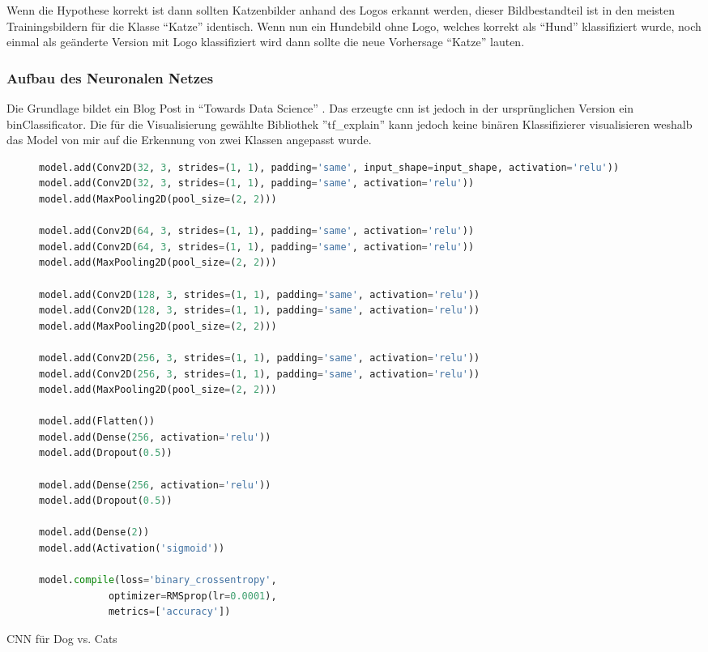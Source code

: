 \documentclass[
  12pt, %
  a4paper, %
  oneside, %
  openany, 
  numbers=noenddot, %
  BCOR=5mm, %
  parskip=half*, %
  thesis, %
]{bfhbook}
\begin{document}
Wenn die Hypothese korrekt ist dann sollten Katzenbilder anhand des Logos erkannt werden, dieser Bildbestandteil ist in den meisten Trainingsbildern für die Klasse ``Katze'' identisch. Wenn nun ein Hundebild ohne Logo, welches korrekt als ``Hund'' klassifiziert wurde, noch einmal als geänderte Version mit Logo klassifiziert wird dann sollte die neue Vorhersage ``Katze'' lauten.

\subsubsection*{Aufbau des Neuronalen Netzes}
Die Grundlage bildet ein Blog Post in ``Towards Data Science''  \cite{dogVsCats}. Das erzeugte \acrshort{cnn} ist jedoch in der ursprünglichen Version ein \Gls{binClassificator}. Die für die Visualisierung gewählte Bibliothek ''tf\_explain'' \cite{tfExplain} kann jedoch keine binären Klassifizierer visualisieren weshalb das Model von mir auf die Erkennung von zwei Klassen angepasst wurde.

\begin{figure}
\begin{lstlisting}[language=Python]
model.add(Conv2D(32, 3, strides=(1, 1), padding='same', input_shape=input_shape, activation='relu'))
model.add(Conv2D(32, 3, strides=(1, 1), padding='same', activation='relu'))
model.add(MaxPooling2D(pool_size=(2, 2)))

model.add(Conv2D(64, 3, strides=(1, 1), padding='same', activation='relu'))
model.add(Conv2D(64, 3, strides=(1, 1), padding='same', activation='relu'))
model.add(MaxPooling2D(pool_size=(2, 2)))

model.add(Conv2D(128, 3, strides=(1, 1), padding='same', activation='relu'))
model.add(Conv2D(128, 3, strides=(1, 1), padding='same', activation='relu'))
model.add(MaxPooling2D(pool_size=(2, 2)))

model.add(Conv2D(256, 3, strides=(1, 1), padding='same', activation='relu'))
model.add(Conv2D(256, 3, strides=(1, 1), padding='same', activation='relu'))
model.add(MaxPooling2D(pool_size=(2, 2)))

model.add(Flatten())
model.add(Dense(256, activation='relu'))
model.add(Dropout(0.5))

model.add(Dense(256, activation='relu'))
model.add(Dropout(0.5))

model.add(Dense(2))
model.add(Activation('sigmoid'))
    
model.compile(loss='binary_crossentropy',
            optimizer=RMSprop(lr=0.0001),
            metrics=['accuracy'])
\end{lstlisting}
\end{figure}
\caption{CNN für Dog vs. Cats}
\end{document}
